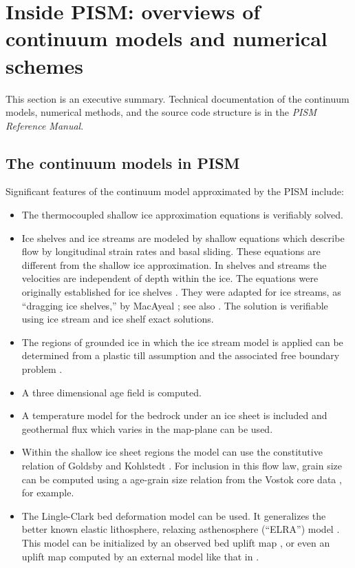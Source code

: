 \documentclass[11pt,final]{amsart}
\begin{document}
\clearpage\newpage
\section{Inside PISM: overviews of continuum models and numerical schemes}\label{sect:over}

This section is an executive summary.  Technical documentation of the continuum models, numerical methods, and the source code structure is in the \emph{PISM Reference Manual}.

\subsection{The continuum models in PISM}  Significant features of the continuum model approximated by the PISM include:\begin{itemize}
\item The thermocoupled shallow ice approximation equations \cite{Fowler} is verifiably \cite{BLKCB,BBL} solved.
\item Ice shelves and ice streams are modeled by shallow equations which describe flow by longitudinal strain rates and basal sliding.  These equations are different from the shallow ice approximation.  In shelves and streams the velocities are independent of depth within the ice.  The equations were originally established for ice shelves \cite{Morland,MorlandZainuddin,MacAyealetal,WeisGreveHutter}.  They were adapted for ice streams, as ``dragging ice shelves,'' by MacAyeal \cite{MacAyeal}; see also \cite{HulbeMacAyeal,SchoofStream}.  The solution is verifiable using ice stream and ice shelf exact solutions.
\item The regions of grounded ice in which the ice stream model is applied can be determined from a plastic till assumption and the associated free boundary problem \cite{SchoofStream}.
\item A three dimensional age field is computed.
\item A temperature model for the bedrock under an ice sheet is included and geothermal flux which varies in the map-plane can be used.
\item Within the shallow ice sheet regions the model can use the constitutive relation of Goldsby and Kohlstedt \cite{GoldsbyKohlstedt,Peltieretal}.  For inclusion in this flow law, grain size can be computed using a age-grain size relation from the Vostok core data \cite{VostokCore}, for example.
\item The Lingle-Clark \cite{BLKfastearth,LingleClark} bed deformation model can be used.  It generalizes the better known elastic lithosphere, relaxing asthenosphere (``ELRA'') model \cite{Greve2001}.  This model can be initialized by an observed bed uplift map \cite{BLKfastearth}, or even an uplift map computed by an external model like that in \cite{IvinsJames2005}.\end{itemize}
\end{document}
